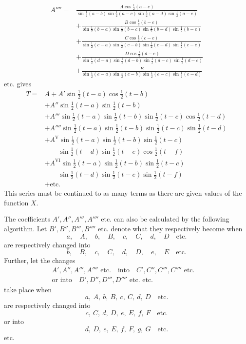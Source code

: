 \[\begin{aligned}
A''''={}&\frac{A\cos\tfrac12(a-e)}{\sin\tfrac12(a-b)\sin\tfrac12(a-c)\sin\tfrac12(a-d)\sin\tfrac12(a-e)}\\[5pt]
&+\frac{B\cos\tfrac12(b-e)}{\sin\tfrac12(b-a)\sin\tfrac12(b-c)\sin\tfrac12(b-d)\sin\tfrac12(b-e)}\\[5pt]
&+\frac{C\cos\tfrac12(c-e)}{\sin\tfrac12(c-a)\sin\tfrac12(c-b)\sin\tfrac12(c-d)\sin\tfrac12(c-e)}\\[5pt]
&+\frac{D\cos\tfrac12(d-e)}{\sin\tfrac12(d-a)\sin\tfrac12(d-b)\sin\tfrac12(d-c)\sin\tfrac12(d-e)}\\[5pt]
&+\frac{E}{\sin\tfrac12(e-a)\sin\tfrac12(e-b)\sin\tfrac12(e-c)\sin\tfrac12(e-d)}
\end{aligned}
\]
etc. gives
\[
\begin{aligned}
T={}&A+A'\sin\tfrac12(t-a)\cos\tfrac12(t-b)\\[5pt]
&+A''\sin\tfrac12(t-a)\sin\tfrac12(t-b)\\[5pt]
&+A'''\sin\tfrac12(t-a)\sin\tfrac12(t-b)\sin\tfrac12(t-c)\cos\tfrac12(t-d)\\[5pt]
&+A''''\sin\tfrac12(t-a)\sin\tfrac12(t-b)\sin\tfrac12(t-c)\sin\tfrac12(t-d)\\[5pt]
&+A^{\mathrm{V}}\sin\tfrac12(t-a)\sin\tfrac12(t-b)\sin\tfrac12(t-c)\\[5pt]&\qquad \sin\tfrac12(t-d)\sin\tfrac12(t-e)\cos\tfrac12(t-f)\\[5pt]
&+A^{\mathrm{VI}}\sin\tfrac12(t-a)\sin\tfrac12(t-b)\sin\tfrac12(t-c)\\[5pt]&\qquad \sin\tfrac12(t-d)\sin\tfrac12(t-e)\sin\tfrac12(t-f)\\[5pt]
&+\text{etc.}
\end{aligned}
\]
This series must be continued to as many terms as there are given values of the function $X$.

The coefficients $A',A'',A''',A''''$ etc. can also be calculated by the following algorithm.
Let $B',B'',B''',B''''$ etc. denote what they respectively become when
\[
a,\quad A,\quad b,\quad B,\quad c,\quad C,\quad d,\quad D\quad\text{etc.}
\]
are respectively changed into
\[
b,\quad B,\quad c,\quad C,\quad d,\quad D,\quad e,\quad E\quad\text{etc.}
\]
Further, let the changes
\[\begin{gathered}
A',A'',A''',A''''\text{ etc.}\quad\text{into}\quad C',C'',C''',C''''\text{ etc.}\quad
\\[5pt]\text{or into}\quad D',D'',D''',D''''\text{ etc. etc.}
\end{gathered}\]
take place when
\[
a,\ A,\ b,\ B,\ c,\ C,\ d,\ D\quad\text{etc.}
\]
are respectively changed into
\[
c,\ C,\ d,\ D,\ e,\ E,\ f,\ F\quad\text{etc.}
\]
or into
\[
d,\ D,\ e,\ E,\ f,\ F,\ g,\ G\quad\text{etc.}
\]
\hspace*{2em}etc.

